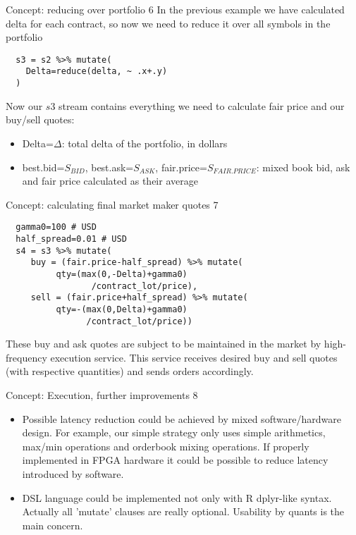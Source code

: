 \documentclass[10pt]{beamer}
\begin{document}
\begin{frame}[fragile]{Concept: reducing over portfolio 6}
In the previous example we have calculated delta for each contract, so now we need to reduce it over all symbols in the portfolio
\begin{lstlisting}
  s3 = s2 %>% mutate(
    Delta=reduce(delta, ~ .x+.y)
  )
\end{lstlisting}
Now our $s3$ stream contains everything we need to calculate fair price and our buy/sell quotes:
\begin{itemize}
	\item Delta=$\Delta$: total delta of the portfolio, in dollars
	\item best.bid=$S_{BID}$, best.ask=$S_{ASK}$, fair.price=$S_{FAIR.PRICE}$: mixed book bid, ask and fair price calculated as their average
\end{itemize}
\end{frame}

\begin{frame}[fragile]{Concept: calculating final market maker quotes 7}
\begin{lstlisting}
  gamma0=100 # USD
  half_spread=0.01 # USD
  s4 = s3 %>% mutate(
     buy = (fair.price-half_spread) %>% mutate(
          qty=(max(0,-Delta)+gamma0)
                 /contract_lot/price),
     sell = (fair.price+half_spread) %>% mutate(
          qty=-(max(0,Delta)+gamma0)
                /contract_lot/price))
\end{lstlisting}
These buy and ask quotes are subject to be maintained in the market by high-frequency execution service. This service receives desired buy and sell quotes (with respective quantities) and sends orders accordingly.
\end{frame}

\begin{frame}{Concept: Execution, further improvements 8}
\begin{itemize}
\item Possible latency reduction could be achieved by mixed software/hardware design. For example, our simple strategy only uses simple arithmetics, max/min operations and orderbook mixing operations. If properly implemented in FPGA hardware it could be possible to reduce latency introduced by software.
\item DSL language could be implemented not only with R dplyr-like syntax. Actually all 'mutate' clauses are really optional. Usability by quants is the main concern.
\end{itemize}
\end{frame}
\end{document}
